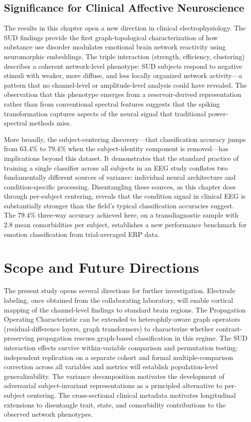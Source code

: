 \subsection{Significance for Clinical Affective Neuroscience}

The results in this chapter open a new direction in clinical electrophysiology. The SUD findings provide the first graph-topological characterization of how substance use disorder modulates emotional brain network reactivity using neuromorphic embeddings. The triple interaction (strength, efficiency, clustering) describes a coherent network-level phenotype: SUD subjects respond to negative stimuli with weaker, more diffuse, and less locally organized network activity---a pattern that no channel-level or amplitude-level analysis could have revealed. The observation that this phenotype emerges from a reservoir-derived representation rather than from conventional spectral features suggests that the spiking transformation captures aspects of the neural signal that traditional power-spectral methods miss.

More broadly, the subject-centering discovery---that classification accuracy jumps from $63.4\%$ to $79.4\%$ when the subject-identity component is removed---has implications beyond this dataset. It demonstrates that the standard practice of training a single classifier across all subjects in an EEG study conflates two fundamentally different sources of variance: individual neural architecture and condition-specific processing. Disentangling these sources, as this chapter does through per-subject centering, reveals that the condition signal in clinical EEG is substantially stronger than the field's typical classification accuracies suggest. The $79.4\%$ three-way accuracy achieved here, on a transdiagnostic sample with $2.8$ mean comorbidities per subject, establishes a new performance benchmark for emotion classification from trial-averaged ERP data.


\section{Scope and Future Directions}
\label{sec:ch5_scope}

The present study opens several directions for further investigation. Electrode labeling, once obtained from the collaborating laboratory, will enable cortical mapping of the channel-level findings to standard brain regions. The Propagation Operating Characteristic can be extended to heterophily-aware graph operators (residual-difference layers, graph transformers) to characterize whether contrast-preserving propagation rescues graph-based classification in this regime. The SUD interaction effects survive within-variable comparison and permutation testing; independent replication on a separate cohort and formal multiple-comparison correction across all variables and metrics will establish population-level generalizability. The variance decomposition motivates the development of adversarial subject-invariant representations as a principled alternative to per-subject centering. The cross-sectional clinical metadata motivates longitudinal extensions to disentangle trait, state, and comorbidity contributions to the observed network phenotypes.


